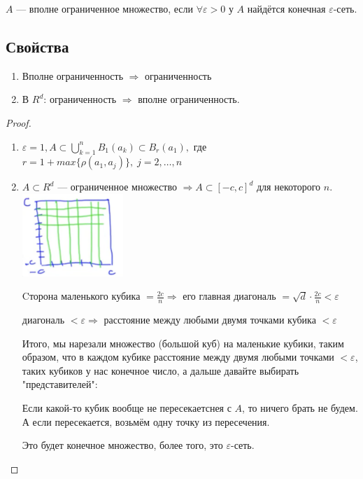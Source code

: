 \begin{conj}
    $A$ --- вполне ограниченное множество, если $\forall \varepsilon > 0$ у $A$ найдётся конечная $\varepsilon$-сеть.
\end{conj}

\subsection*{Свойства} 

\begin{enumerate}
    \item Вполне ограниченность $\Longrightarrow$ ограниченность
    \item В $R^d$: ограниченность $\Longrightarrow$ вполне ограниченность.
\end{enumerate}

\begin{proof}
    \begin{enumerate}
        \item $\varepsilon = 1, A \subset \bigcup\limits_{k=1}^{n} B_1(a_k) \subset B_r(a_1),$ где $r = 1 + max \{ \rho(a_1, a_j) \}, \; j = 2, \dots, n$
        \item $A \subset R^d$ --- ограниченное множество $\Longrightarrow A \subset [-c, c]^d$ для некоторого $n$. \\

        \includegraphics[width=1.5in]{./images/T46_pic.png} %

        Cторона маленького кубика $= \frac{2c}{n} \Longrightarrow$ его главная диагональ $= \sqrt{d} \cdot \frac{2c}{n} < \varepsilon$

        диагональ $< \varepsilon \Longrightarrow$ расстояние между любыми двумя точками кубика $< \varepsilon$

        Итого, мы нарезали множество (большой куб) на маленькие кубики, таким образом, что в каждом кубике расстояние между двумя любыми точками $< \varepsilon$,
        таких кубиков у нас конечное число, а дальше давайте выбирать "представителей":

        Если какой-то кубик вообще не пересекаетснея с $A$, то ничего брать не будем. А если пересекается, возьмём одну точку из пересечения.

        Это будет конечное множество, более того, это $\varepsilon$-сеть.
    \end{enumerate}
\end{proof}


